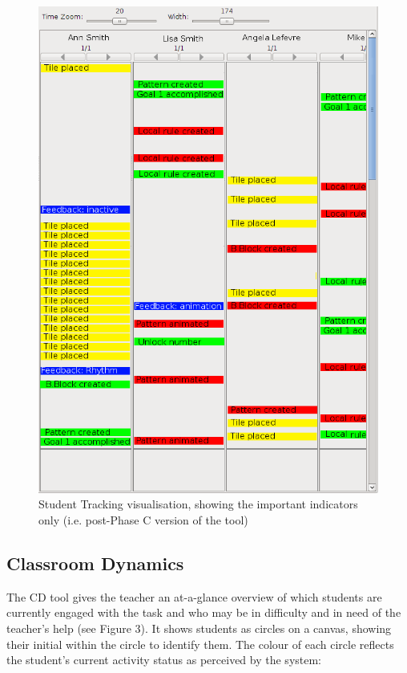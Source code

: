 \begin{figure}[htbp]
  \centering
  \includegraphics[width=\textwidth]{gfx/ta-st}
  \caption{Student Tracking visualisation, showing the important
    indicators only (i.e. post-Phase C version of the tool)}
  \label{fig:stex}
\end{figure}

\subsection{Classroom Dynamics}
\label{sec:classroom-dynamics}

The CD tool gives the teacher an at-a-glance overview of which
students are currently engaged with the task and who may be in
difficulty and in need of the teacher's help (see Figure 3).  It shows
students as circles on a canvas, showing their initial within the
circle to identify them. The colour of each circle reflects the
student's current activity status as perceived by the system:

